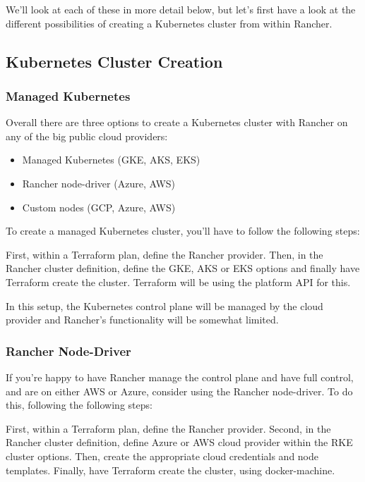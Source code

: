 We'll look at each of these in more detail below, but let's first have a look at the different possibilities of creating a Kubernetes cluster from within Rancher.

\subsection{Kubernetes Cluster Creation}

\subsubsection{Managed Kubernetes}

Overall there are three options to create a Kubernetes cluster with Rancher on any of the big public cloud providers:

\begin{itemize}
\item Managed Kubernetes (GKE, AKS, EKS)
\item Rancher node-driver (Azure, AWS)
\item Custom nodes (GCP, Azure, AWS)
\end{itemize}

To create a managed Kubernetes cluster, you'll have to follow the following steps:

First, within a  Terraform plan, define the Rancher provider. Then, in the Rancher cluster definition, define the GKE, AKS or EKS options and finally have Terraform create the cluster. Terraform will be using the platform API for this.

In this setup, the Kubernetes control plane will be managed by the cloud provider and Rancher's functionality will be somewhat limited.

\subsubsection{Rancher Node-Driver}

If you're happy to have Rancher manage the control plane and have full control, and are on either AWS or Azure, consider using the Rancher node-driver. To do this, following the following steps:

First, within a  Terraform plan, define the Rancher provider. Second, in the Rancher cluster definition, define Azure or AWS cloud provider within the RKE cluster options. Then, create the appropriate cloud credentials and node templates. Finally, have Terraform create the cluster, using docker-machine.

